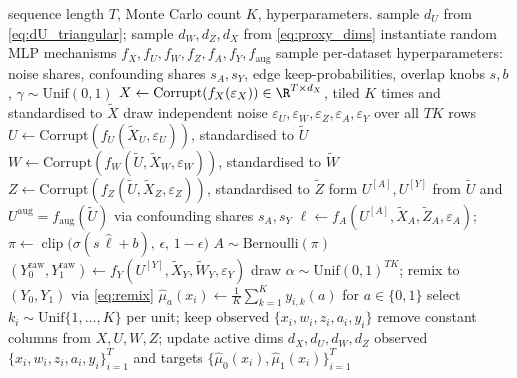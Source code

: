 \begin{algorithm}[t]
\caption{Generation of one proximal dataset.}
\label{alg:prior}
\begin{algorithmic}[1]
\Require sequence length $T$, Monte Carlo count $K$, hyperparameters.
\State sample $d_U$ from \eqref{eq:dU_triangular}; sample $d_W,d_Z,d_X$ from \eqref{eq:proxy_dims}
\State instantiate random MLP mechanisms $f_X,f_U,f_W,f_Z,f_A,f_Y,f_{\mathrm{aug}}$
\State sample per-dataset hyperparameters: noise shares, confounding shares $s_A,s_Y$, edge keep-probabilities, overlap knobs $s,b$, $\gamma\sim\mathrm{Unif}(0,1)$
\Statex\vspace{2pt}
\Repeat
  \State $X \gets \mathrm{Corrupt}(f_X(\varepsilon_X)) \in \R^{T\times d_X}$, tiled $K$ times and standardised to $\tilde X$
  \State draw independent noise $\varepsilon_U,\varepsilon_W,\varepsilon_Z,\varepsilon_A,\varepsilon_Y$ over all $TK$ rows
  \State $U \gets \mathrm{Corrupt}(f_U(\tilde X_U,\varepsilon_U))$, standardised to $\tilde U$
  \State $W \gets \mathrm{Corrupt}(f_W(\tilde U,\tilde X_W,\varepsilon_W))$, standardised to $\tilde W$ 
  \State $Z \gets \mathrm{Corrupt}(f_Z(\tilde U,\tilde X_Z,\varepsilon_Z))$, standardised to $\tilde Z$ 
  \State form $U^{[A]},U^{[Y]}$ from $\tilde U$ and $U^{\mathrm{aug}}=f_{\mathrm{aug}}(\tilde U)$ via confounding shares $s_A,s_Y$
  \State $\ell \gets f_A(U^{[A]},\tilde X_A,\tilde Z_A,\varepsilon_A)$;\quad $\pi \gets \operatorname{clip}\big(\sigma(s\,\hat\ell+b),\,\epsilon,\,1-\epsilon\big)$
  \State $A \sim \mathrm{Bernoulli}(\pi)$
  \State $(Y_0^{\mathrm{raw}},Y_1^{\mathrm{raw}}) \gets f_Y(U^{[Y]},\tilde X_Y,\tilde W_Y,\varepsilon_Y)$
  \State draw $\alpha\sim\mathrm{Unif}(0,1)^{TK}$; remix to $(Y_0,Y_1)$ via \eqref{eq:remix}
  \State $\hat\mu_a(x_i) \gets \tfrac1K\sum_{k=1}^K y_{i,k}(a)$ for $a\in\{0,1\}$
  \State select $k_i\sim\mathrm{Unif}\{1,\dots,K\}$ per unit; keep observed $\{x_i,w_i,z_i,a_i,y_i\}$
  \State remove constant columns from $X,U,W,Z$; update active dims $d_X,d_U,d_W,d_Z$ \label{line:constant_column_filter}
\Statex\vspace{2pt}
\State \Return observed $\{x_i,w_i,z_i,a_i,y_i\}_{i=1}^T$ and targets $\{\hat\mu_0(x_i),\hat\mu_1(x_i)\}_{i=1}^T$
\end{algorithmic}
\end{algorithm}
